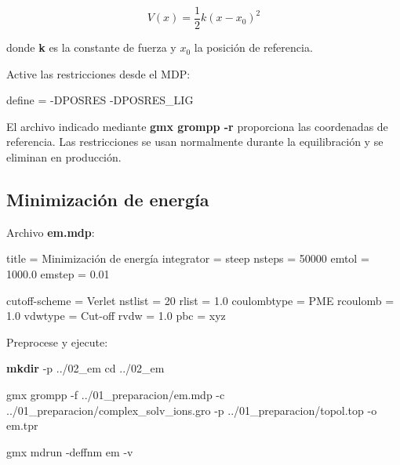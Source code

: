 \documentclass[
  spanish,
  11pt,
  a4paper]{article}
\newenvironment{Shaded}{\begin{snugshade}}{\end{snugshade}}
\newcommand{\AttributeTok}[1]{\textcolor[rgb]{0.13,0.29,0.53}{#1}}
\newcommand{\BuiltInTok}[1]{#1}
\newcommand{\DataTypeTok}[1]{\textcolor[rgb]{0.13,0.29,0.53}{#1}}
\newcommand{\DecValTok}[1]{\textcolor[rgb]{0.00,0.00,0.81}{#1}}
\newcommand{\ExtensionTok}[1]{#1}
\newcommand{\FloatTok}[1]{\textcolor[rgb]{0.00,0.00,0.81}{#1}}
\newcommand{\FunctionTok}[1]{\textcolor[rgb]{0.13,0.29,0.53}{\textbf{#1}}}
\newcommand{\NormalTok}[1]{#1}
\newcommand{\OtherTok}[1]{\textcolor[rgb]{0.56,0.35,0.01}{#1}}
\newcommand{\StringTok}[1]{\textcolor[rgb]{0.31,0.60,0.02}{#1}}
\begin{document}
\[
V(x)=\frac{1}{2}k(x-x_0)^2
\]

donde \textbf{k} es la constante de fuerza y \(x_0\) la posición de
referencia.

Active las restricciones desde el MDP:

\begin{Shaded}
\begin{Highlighting}[]
\DataTypeTok{define }\OtherTok{=}\StringTok{ {-}DPOSRES {-}DPOSRES\_LIG}
\end{Highlighting}
\end{Shaded}

El archivo indicado mediante \textbf{gmx grompp -r} proporciona las
coordenadas de referencia. Las restricciones se usan normalmente durante
la equilibración y se eliminan en producción.

\subsection{Minimización de
energía}\label{minimizaciuxf3n-de-energuxeda}

Archivo \textbf{em.mdp}:

\begin{Shaded}
\begin{Highlighting}[]
\DataTypeTok{title            }\OtherTok{=}\StringTok{ Minimización de energía}
\DataTypeTok{integrator       }\OtherTok{=}\StringTok{ steep}
\DataTypeTok{nsteps           }\OtherTok{=}\StringTok{ }\DecValTok{50000}
\DataTypeTok{emtol            }\OtherTok{=}\StringTok{ }\FloatTok{1000.0}
\DataTypeTok{emstep           }\OtherTok{=}\StringTok{ }\FloatTok{0.01}

\DataTypeTok{cutoff{-}scheme    }\OtherTok{=}\StringTok{ Verlet}
\DataTypeTok{nstlist          }\OtherTok{=}\StringTok{ }\DecValTok{20}
\DataTypeTok{rlist            }\OtherTok{=}\StringTok{ }\FloatTok{1.0}
\DataTypeTok{coulombtype      }\OtherTok{=}\StringTok{ PME}
\DataTypeTok{rcoulomb         }\OtherTok{=}\StringTok{ }\FloatTok{1.0}
\DataTypeTok{vdwtype          }\OtherTok{=}\StringTok{ Cut{-}off}
\DataTypeTok{rvdw             }\OtherTok{=}\StringTok{ }\FloatTok{1.0}
\DataTypeTok{pbc              }\OtherTok{=}\StringTok{ xyz}
\end{Highlighting}
\end{Shaded}

Preprocese y ejecute:

\begin{Shaded}
\begin{Highlighting}[]
\FunctionTok{mkdir} \AttributeTok{{-}p}\NormalTok{ ../02\_em}
\BuiltInTok{cd}\NormalTok{ ../02\_em}

\ExtensionTok{gmx}\NormalTok{ grompp     }\AttributeTok{{-}f}\NormalTok{ ../01\_preparacion/em.mdp     }\AttributeTok{{-}c}\NormalTok{ ../01\_preparacion/complex\_solv\_ions.gro     }\AttributeTok{{-}p}\NormalTok{ ../01\_preparacion/topol.top     }\AttributeTok{{-}o}\NormalTok{ em.tpr}

\ExtensionTok{gmx}\NormalTok{ mdrun }\AttributeTok{{-}deffnm}\NormalTok{ em }\AttributeTok{{-}v}
\end{Highlighting}
\end{Shaded}
\end{document}
